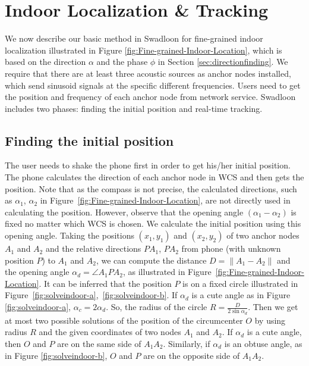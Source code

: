 \documentclass[]{sig-alternate-10pt}
\newcommand{\MYCUT}[1]{{ }}
\def \ourprotocol{Swadloon\xspace}
\begin{document}
\section{Indoor Localization \& Tracking}
\label{sec:localization}

We now describe our basic
 method in \ourprotocol for  fine-grained indoor localization
 illustrated in Figure \ref{fig:Fine-grained-Indoor-Location}, which is based on the direction $\alpha$ and the phase $\phi$ in Section \ref{sec:directionfinding}.
We require that there are at least three acoustic sources as
 anchor nodes installed, which send sinusoid signals at
 the specific different  frequencies.
Users need to get the position and frequency of
 each anchor node from network service.
\ourprotocol includes two phases:
 finding the initial position and real-time tracking.





\subsection{Finding the initial position}
The user needs to shake the phone first in order to get his/her initial
position.
The phone calculates the direction of each
anchor node in WCS and then gets the position.
Note that as the compass is not precise, the calculated directions,
 such as $\alpha_1$, $\alpha_2$ in
 Figure~\ref{fig:Fine-grained-Indoor-Location}, are not directly  used in
 calculating the  position.
However,  observe that the opening angle
 $(\alpha_1-\alpha_2)$ is fixed no matter which WCS is chosen.
We calculate the initial position using this opening angle.
\MYCUT{\begin{figure}[htpb]
    \begin{center}
\texttt{[image: solveindoor]}
    \end{center}
\caption{Getting the radius $R$ and the center of circle $O$ by using
  $D$ and $\alpha_d$.  }\label{fig:solveindoor}
\end{figure}
}Taking the positions $(x_1, y_1)$ and $(x_2, y_2)$ of two anchor nodes
 $A_1$ and $A_2$ and the relative directions $PA_1$, $PA_2$ from phone (with unknown
 position $P$) to $A_1$ and $A_2$, we can compute the distance
 $D=\|A_1 -A_2\|$ and the opening angle $\alpha_d = \angle A_1 P
 A_2$, as illustrated in Figure~\ref{fig:Fine-grained-Indoor-Location}.
It can be inferred that the position $P$ is on a fixed circle
 illustrated in Figure~\ref{fig:solveindoor-a},~\ref{fig:solveindoor-b}.
If $\alpha_d$ is a cute angle as in Figure \ref{fig:solveindoor-a},
 $\alpha_c=2\alpha_d$.
So, the radius of the circle $R=\frac{D}{2\sin \alpha_d}$.
Then we get at most two possible solutions of the position
 of the circumcenter $O$ by using radius $R$ and the given coordinates
 of   two nodes $A_1$ and $A_2$.
If $\alpha_d$ is a cute angle, then $O$ and $P$ are on the same side
 of $A_1A_2$.
Similarly, if $\alpha_d$ is an obtuse angle, as in Figure \ref{fig:solveindoor-b},
 $O$ and $P$ are on the opposite side of $A_1A_2$.
\end{document}
